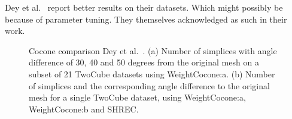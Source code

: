 Dey et al.~\cite{Dey2012,Dey2013} report better results on their datasets. Which might possibly be because of parameter tuning. They themselves acknowledged as such in their work.
\begin{figure}
		\caption{Cocone comparison Dey et al.~\cite{Dey2012,Dey2013}. (a) Number of simplices with angle difference of 30, 40 and 50 degrees from the original mesh on a subset of 21 TwoCube datasets using WeightCocone:a. (b) Number of simplices and the corresponding angle difference to the original mesh for a single TwoCube dataset, using WeightCocone:a, WeightCocone:b and SHREC.}
\end{figure}
